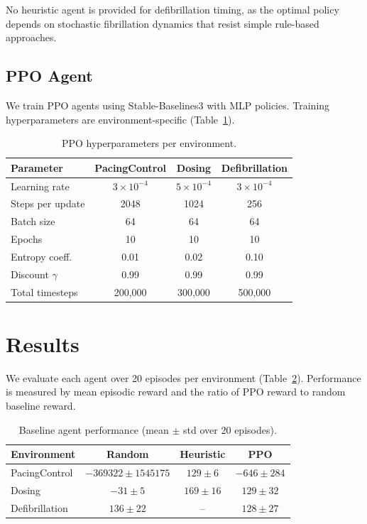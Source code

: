 \documentclass[11pt,a4paper]{article}
\begin{document}
No heuristic agent is provided for defibrillation timing, as the optimal policy depends on stochastic fibrillation dynamics that resist simple rule-based approaches.

\subsection{PPO Agent}

We train PPO agents \citep{schulman2017proximal} using Stable-Baselines3 \citep{raffin2021stable} with MLP policies. Training hyperparameters are environment-specific (Table~\ref{tab:hyperparameters}).

\begin{table}[h]
\centering
\caption{PPO hyperparameters per environment.}
\label{tab:hyperparameters}
\begin{tabular}{lccc}
\toprule
Parameter & PacingControl & Dosing & Defibrillation \\
\midrule
Learning rate & $3 \times 10^{-4}$ & $5 \times 10^{-4}$ & $3 \times 10^{-4}$ \\
Steps per update & 2048 & 1024 & 256 \\
Batch size & 64 & 64 & 64 \\
Epochs & 10 & 10 & 10 \\
Entropy coeff. & 0.01 & 0.02 & 0.10 \\
Discount $\gamma$ & 0.99 & 0.99 & 0.99 \\
Total timesteps & 200,000 & 300,000 & 500,000 \\
\bottomrule
\end{tabular}
\end{table}

\section{Results}

We evaluate each agent over 20 episodes per environment (Table~\ref{tab:results}). Performance is measured by mean episodic reward and the ratio of PPO reward to random baseline reward.

\begin{table}[h]
\centering
\caption{Baseline agent performance (mean $\pm$ std over 20 episodes).}
\label{tab:results}
\begin{tabular}{lccc}
\toprule
Environment & Random & Heuristic & PPO \\
\midrule
PacingControl & $-369322 \pm 1545175$ & $129 \pm 6$ & $-646 \pm 284$ \\
Dosing & $-31 \pm 5$ & $169 \pm 16$ & $129 \pm 32$ \\
Defibrillation & $136 \pm 22$ & -- & $128 \pm 27$ \\
\bottomrule
\end{tabular}
\end{table}
\end{document}
